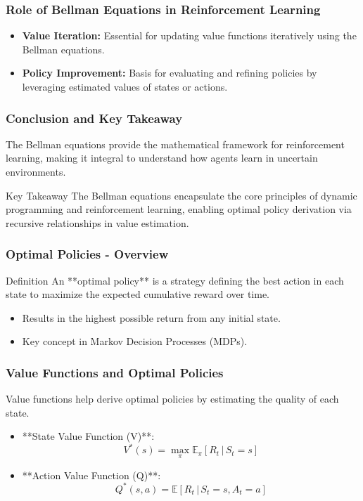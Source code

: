 \documentclass[aspectratio=169]{beamer}
\begin{document}
\begin{frame}[fragile]
    \frametitle{Role of Bellman Equations in Reinforcement Learning}
    \begin{itemize}
        \item \textbf{Value Iteration:} Essential for updating value functions iteratively using the Bellman equations.
        \item \textbf{Policy Improvement:} Basis for evaluating and refining policies by leveraging estimated values of states or actions.
    \end{itemize}
\end{frame}

\begin{frame}[fragile]
    \frametitle{Conclusion and Key Takeaway}
    The Bellman equations provide the mathematical framework for reinforcement learning, making it integral to understand how agents learn in uncertain environments.

    \begin{block}{Key Takeaway}
        The Bellman equations encapsulate the core principles of dynamic programming and reinforcement learning, enabling optimal policy derivation via recursive relationships in value estimation.
    \end{block}
\end{frame}

\begin{frame}[fragile]
    \frametitle{Optimal Policies - Overview}
    \begin{block}{Definition}
        An **optimal policy** is a strategy defining the best action in each state to maximize the expected cumulative reward over time.
    \end{block}
    \begin{itemize}
        \item Results in the highest possible return from any initial state.
        \item Key concept in Markov Decision Processes (MDPs).
    \end{itemize}
\end{frame}

\begin{frame}[fragile]
    \frametitle{Value Functions and Optimal Policies}
    Value functions help derive optimal policies by estimating the quality of each state.
    
    \begin{itemize}
        \item **State Value Function (V)**: 
        \begin{equation}
            V^*(s) = \max_\pi \mathbb{E}_\pi \left[ R_t \,|\, S_t = s \right]
        \end{equation}
        
        \item **Action Value Function (Q)**: 
        \begin{equation}
            Q^*(s, a) = \mathbb{E} \left[ R_t \,|\, S_t = s, A_t = a \right]
        \end{equation}
    \end{itemize}
\end{frame}
\end{document}
